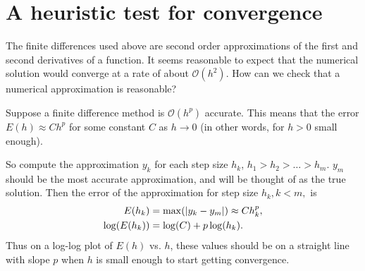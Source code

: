 \section*{A heuristic test for convergence}
The finite differences used above are second order approximations of the first and second derivatives of a function.  It seems reasonable to expect that the numerical solution would converge at a rate of about $\mathcal{O}(h^2)$. How can we check that a numerical approximation is reasonable?

Suppose a finite difference method is $\mathcal{O}(h^p)$ accurate.
This means that the error $E(h) \approx Ch^p$ for some constant $C$ as $h \to 0$ (in other words, for $h>0$ small enough).

So compute the approximation $y_k$ for each step size $h_k$, $h_1 > h_2> \ldots>h_m$.
$y_m$ should be the most accurate approximation, and will be thought of as the true solution.
Then the error of the approximation for
step size $h_k, k < m,$ is
\begin{align*}
	E(h_k) &= \max( \left\lvert y_k - y_m\right\rvert) \approx C h_k^p ,\\
	\log(E(h_k)) &= \log(C) + p \log(h_k).
\end{align*}
Thus on a log-log plot of $E(h)$ vs. $h$, these values should be on a straight line with slope $p$ when $h$ is small enough to start getting convergence.

